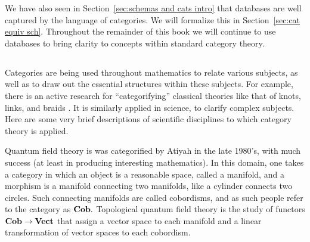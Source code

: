 \documentclass[../main/CT4S-EN-RU]{subfiles}
\begin{document}
\begin{blockENG}
We have also seen in Section~\ref{sec:schemas and cats intro} that databases are well captured by the language of categories. We will formalize this in Section~\ref{sec:cat equiv sch}. Throughout the remainder of this book we will continue to use databases to bring clarity to concepts within standard category theory. 
\end{blockENG}

\begin{blockRUS}
\end{blockRUS}


\subsection{} 

\begin{blockENG}
Categories are being used throughout mathematics to relate various subjects, as well as to draw out the essential structures within these subjects. For example, there is an active research for “categorifying” classical theories like that of knots, links, and braids \cite{Kho}. It is similarly applied in science, to clarify complex subjects. Here are some very brief descriptions of scientific disciplines to which category theory is applied.
\end{blockENG}

\begin{blockRUS}
\end{blockRUS}

\begin{blockENG}
Quantum field theory is was categorified by Atiyah \cite{Ati} in the late 1980's, with much success (at least in producing interesting mathematics). In this domain, one takes a category in which an object is a reasonable space, called a manifold, and a morphism is a manifold connecting two manifolds, like a cylinder connects two circles. Such connecting manifolds are called cobordisms, and as such people refer to the category as ${\mathbf{Cob}}.$ Topological quantum field theory is the study of functors ${\mathbf{Cob}}\rightarrow{\mathbf{Vect}}$ that assign a vector space to each manifold and a linear transformation of vector spaces to each cobordism. 
\end{blockENG}

\begin{blockRUS}
\end{blockRUS}
\end{document}
